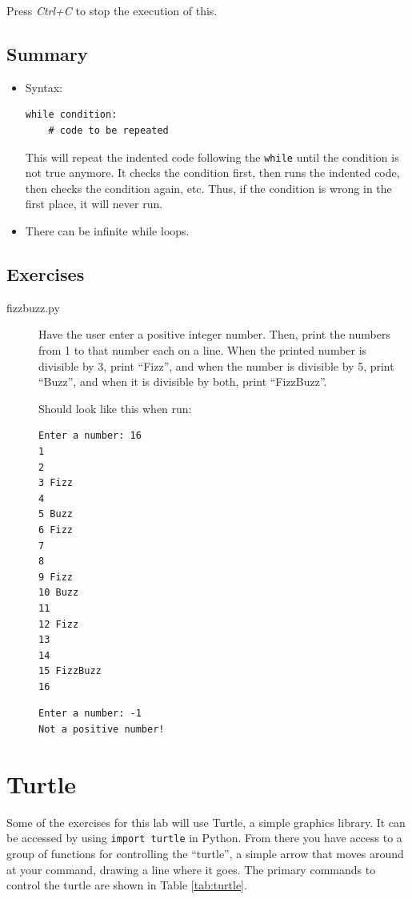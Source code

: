 \documentclass[11pt,hidelinks]{article}
\begin{document}
Press \emph{Ctrl+C} to stop the execution of this.

\subsection{Summary}

\begin{itemize}
  \item Syntax:
    \begin{lstlisting}
while condition:
    # code to be repeated
    \end{lstlisting}

    This will repeat the indented code following the \lstinline!while! until the
    condition is not true anymore. It checks the condition first, then runs the
    indented code, then checks the condition again, etc. Thus, if the condition
    is wrong in the first place, it will never run.

  \item There can be infinite while loops.
\end{itemize}

\subsection{Exercises}
\label{subsec:whileex}

\begin{description}
  \item[fizzbuzz.py] Have the user enter a positive integer number. Then, print
    the numbers from 1 to that number each on a line. When the printed number is
    divisible by 3, print ``Fizz'', and when the number is divisible by 5, print
    ``Buzz'', and when it is divisible by both, print ``FizzBuzz''.

    Should look like this when run:
    \begin{lstlisting}[style=bash]
Enter a number: 16
1
2
3 Fizz
4
5 Buzz
6 Fizz
7
8
9 Fizz
10 Buzz
11
12 Fizz
13
14
15 FizzBuzz
16
    \end{lstlisting}
    \begin{lstlisting}[style=bash]
Enter a number: -1
Not a positive number!
    \end{lstlisting}

\end{description}

\pagebreak
\section{Turtle}
Some of the exercises for this lab will use Turtle, a simple graphics library. It can be accessed by using \lstinline{import turtle} in Python. From there you have access to a group of functions for controlling the ``turtle'', a simple arrow that moves around at your command, drawing a line where it goes. The primary commands to control the turtle are shown in Table \ref{tab:turtle}.
\end{document}
